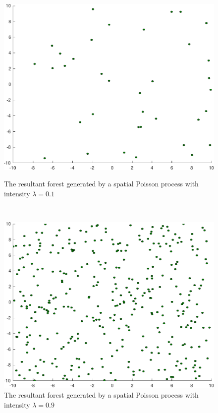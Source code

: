 \begin{figure}[!t]
  \begin{minipage}[c]{0.9\columnwidth}
    \includegraphics[width=.95\columnwidth]{figures/experiments/poisson009}
    \caption{The resultant forest generated by a spatial Poisson process with
      intensity \(\lambda = 0.1\)}
    \label{fig:poisson009}
  \end{minipage}%
%
\,
%
  \begin{minipage}[c]{0.9\columnwidth}
    \includegraphics[width=.95\columnwidth]{figures/experiments/poisson09}
    \caption{The resultant forest generated by a spatial Poisson process with
      intensity \(\lambda = 0.9\)}
    \label{fig:poisson09}
  \end{minipage}
\end{figure}

